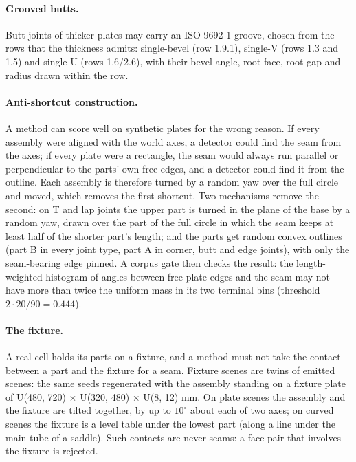 \paragraph{Grooved butts.} Butt joints of thicker plates may carry an ISO 9692-1 groove,
chosen from the rows that the thickness admits: single-bevel (row 1.9.1), single-V (rows 1.3
and 1.5) and single-U (rows 1.6/2.6), with their bevel angle, root face, root gap and radius
drawn within the row.

\paragraph{Anti-shortcut construction.} A method can score well on synthetic plates for the
wrong reason. If every assembly were aligned with the world axes, a detector could find the seam
from the axes; if every plate were a rectangle, the seam would always run parallel or perpendicular
to the parts' own free edges, and a detector could find it from the outline. Each assembly is
therefore turned by a random yaw over the full circle and moved, which removes the first shortcut.
Two mechanisms remove the second: on T and lap joints the upper part is turned in the plane of the
base by a random yaw, drawn over the part of the full circle in which the seam keeps at least half
of the shorter part's length; and the parts get random convex outlines (part B in every joint type,
part A in corner, butt and edge joints), with only the seam-bearing edge pinned. A corpus gate then
checks the result: the length-weighted histogram of angles between free plate edges and the seam
may not have more than twice the uniform mass in its two terminal bins (threshold
$2\cdot 20/90=0.444$).

\paragraph{The fixture.} A real cell holds its parts on a fixture, and a method must not take
the contact between a part and the fixture for a seam. Fixture scenes are twins of emitted scenes:
the same seeds regenerated with the assembly standing on a fixture plate of
U(480, 720) $\times$ U(320, 480) $\times$ U(8, 12) mm. On plate scenes the assembly and the fixture
are tilted together, by up to $10^\circ$ about each of two axes; on curved scenes the fixture is a
level table under the lowest part (along a line under the main tube of a saddle). Such contacts are
never seams: a face pair that involves the fixture is rejected.

